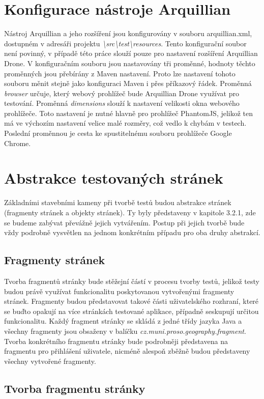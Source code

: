 \documentclass[
    color,   %
	table,   %
    twoside, %
]{fithesis3}
\begin{document}
\section{Konfigurace nástroje Arquillian}
Nástroj Arquillian a jeho rozšíření jsou konfigurovány v souboru arquillian.xml, dostupném v adresáři projektu \emph{\textbackslash src\textbackslash test\textbackslash resources}. Tento konfigurační soubor není povinný, v případě této práce slouží pouze pro nastavení rozšíření Arquillian Drone. V konfiguračním souboru jsou nastavovány tři proměnné, hodnoty těchto proměnných jsou přebírány z Maven nastavení. Proto lze nastavení tohoto souboru měnit stejně jako konfiguraci Maven i přes příkazový řádek. Proměnná \emph{browser} určuje, který webový prohlížeč bude Arquillian Drone využívat pro testování. Proměnná \emph{dimensions} slouží k nastavení velikosti okna webového prohlížeče. Toto nastavení je nutné hlavně pro prohlížeč PhantomJS, jelikož ten má ve výchozím nastavení velice malé rozměry, což vedlo k chybám v testech. Poslední proměnnou je cesta ke spustitelnému souboru prohlížeče Google Chrome.

\section{Abstrakce testovaných stránek}
Základními stavebními kameny při tvorbě testů budou abstrakce stránek (fragmenty stránek a objekty stránek). Ty byly představeny v kapitole 3.2.1, zde se budeme zabývat převážně jejich vytvářením. Postup při jejich tvorbě bude vždy podrobně vysvětlen na jednom konkrétním případu pro oba druhy abstrakcí.

\subsection{Fragmenty stránek}
Tvorba fragmentů stránky bude stěžejní částí v procesu tvorby testů, jelikož testy budou právě využívat funkcionalitu poskytovanou vytvořenými fragmenty stránek. Fragmenty budou představovat takové části uživatelského rozhraní, které se buďto opakují na více stránkách testované aplikace, případně seskupují určitou funkcionalitu. Každý fragment stránky se skládá z jedné třídy jazyka Java a všechny fragmenty jsou obsaženy v balíčku \emph{cz.muni.proso.geography.fragment}. Tvorba konkrétního fragmentu stránky bude podrobněji představena na fragmentu pro přihlášení uživatele, nicméně alespoň zběžně budou představeny všechny vytvořené fragmenty.

\subsection*{Tvorba fragmentu stránky}
\end{document}
